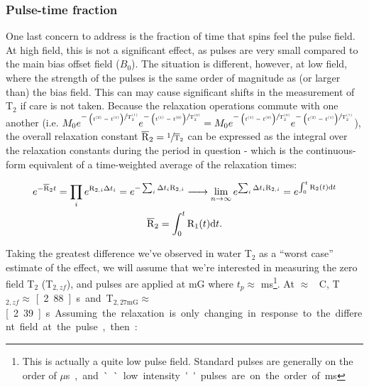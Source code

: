 \documentclass[PaulGanssle-Thesis.tex]{subfiles}
\begin{document}
\subsubsection{Pulse-time fraction}
\label{relaxation.t2.cpmg.pulse.time}
One last concern to address is the fraction of time that spins feel the pulse field. At high field, this is not a significant effect, as pulses are very small compared to the main bias offset field ($B_0$). The situation is different, however, at low field, where the strength of the pulses is the same order of magnitude as (or larger than) the bias field. This can may cause significant shifts in the measurement of T$_2$ if care is not taken. Because the relaxation operations commute with one another (i.e. $M_{0}e^{-\sfrac{\left(t^{(2)}-t^{(1)}\right)}{\mathrm{T}_{2}^{(1)}}}e^{-\sfrac{\left(t^{(1)}-t^{(0)}\right)}{\mathrm{T}_{2}^{(0)}}} =  M_{0}e^{-\sfrac{\left(t^{(1)}-t^{(0)}\right)}{\mathrm{T}_{2}^{(0)}}}e^{-\sfrac{\left(t^{(2)}-t^{(1)}\right)}{\mathrm{T}_{2}^{(1)}}}$), the overall relaxation constant $\overline{\mathrm{R}}_{2} = \sfrac{1}{\overline{\mathrm{T}}_{2}}$ can be expressed as the integral over the relaxation constants during the period in question - which is the continuous-form equivalent of a time-weighted average of the relaxation times:

\begin{gather}
\label{eqn:VaryingR1}
e^{-\overline{\mathrm{R}}_{2}t} = \prod_{i}e^{\mathrm{R}_{2,i}\Delta t_{i}} = e^{-\sum_{i}\Delta t_{i} \mathrm{R}_{2,i}} \xrightarrow{\hspace*{5mm}}\lim_{n\to\infty}e^{\sum_{i}\Delta t_{i}\mathrm{R}_{2,i}} = e^{\int_{0}^{t}\mathrm{R}_{2}(t)\mathrm{d}t} \\
\overline{\mathrm{R}}_{2}  =  \int_{0}^{t}\mathrm{R}_{1}(t)\mathrm{d}t.
\end{gather}

Taking the greatest difference we've observed in water T$_2$ as a ``worst case'' estimate of the effect, we will assume that we're interested in measuring the zero field T$_{2}$ (T$_{2,zf}$), and pulses are applied at \unit[27]{mG} where $t_{p} \approx $ \unit[27]{ms}\footnote{This is actually a quite low pulse field. Standard pulses are generally on the order of \unit[100]{$\mu$s}, and ``low intensity'' pulses are on the order of \unit[1]{ms}}. At $\approx$ \unit[37]{\degsym C}, T$_{2,zf} \approx$ \unit[2.88]{s} and T$_{2,27\mathrm{mG}} \approx $ \unit[2.39]{s}. Assuming the relaxation is only changing in response to the different field at the pulse, then:
\end{document}
